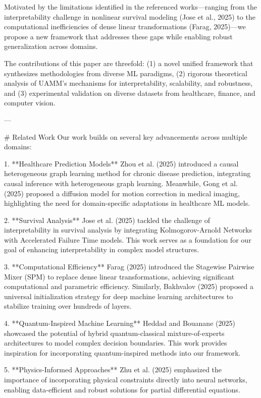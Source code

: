 Motivated by the limitations identified in the referenced works—ranging from the interpretability challenge in nonlinear survival modeling (Jose et al., 2025) to the computational inefficiencies of dense linear transformations (Farag, 2025)—we propose a new framework that addresses these gaps while enabling robust generalization across domains.  

The contributions of this paper are threefold: (1) a novel unified framework that synthesizes methodologies from diverse ML paradigms, (2) rigorous theoretical analysis of UAMM's mechanisms for interpretability, scalability, and robustness, and (3) experimental validation on diverse datasets from healthcare, finance, and computer vision.

---

# Related Work  
Our work builds on several key advancements across multiple domains:  

1. **Healthcare Prediction Models**  
   Zhou et al. (2025) introduced a causal heterogeneous graph learning method for chronic disease prediction, integrating causal inference with heterogeneous graph learning. Meanwhile, Gong et al. (2025) proposed a diffusion model for motion correction in medical imaging, highlighting the need for domain-specific adaptations in healthcare ML models.  

2. **Survival Analysis**  
   Jose et al. (2025) tackled the challenge of interpretability in survival analysis by integrating Kolmogorov-Arnold Networks with Accelerated Failure Time models. This work serves as a foundation for our goal of enhancing interpretability in complex model structures.  

3. **Computational Efficiency**  
   Farag (2025) introduced the Stagewise Pairwise Mixer (SPM) to replace dense linear transformations, achieving significant computational and parametric efficiency. Similarly, Bakhvalov (2025) proposed a universal initialization strategy for deep machine learning architectures to stabilize training over hundreds of layers.  

4. **Quantum-Inspired Machine Learning**  
   Heddad and Bouanane (2025) showcased the potential of hybrid quantum-classical mixture-of-experts architectures to model complex decision boundaries. This work provides inspiration for incorporating quantum-inspired methods into our framework.  

5. **Physics-Informed Approaches**  
   Zhu et al. (2025) emphasized the importance of incorporating physical constraints directly into neural networks, enabling data-efficient and robust solutions for partial differential equations.  

